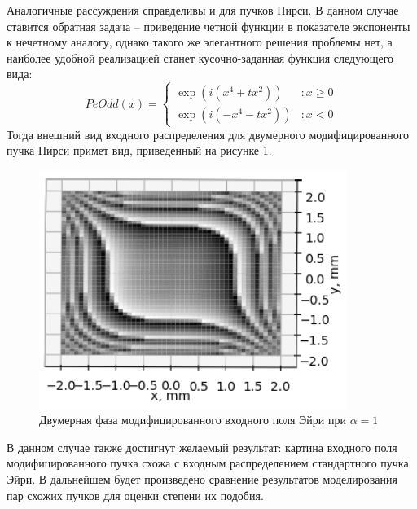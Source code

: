 {{    Аналогичные рассуждения справделивы и для пучков Пирси.
    В данном случае ставится обратная задача -- приведение четной функции в показателе экспоненты к нечетному аналогу,
    однако такого же элегантного решения проблемы нет, а наиболее удобной реализацией станет кусочно-заданная функция следующего вида:
    \[PeOdd(x) = \left\{
    \begin{array}{lr}
        \exp(i(x^4 + tx^2)) & : x \ge 0\\
        \exp(i(-x^4 - tx^2)) & : x < 0
    \end{array}
    \right.
    \]
    Тогда внешний вид входного распределения для двумерного модифицированного пучка Пирси примет вид, приведенный на рисунке \ref{peodd_phase_2d}.
    \begin{figure}[H]
        \begin{center}
            \includegraphics[width=10cm]{plots/peoddphase_new}
            \caption{Двумерная фаза модифицированного входного поля Эйри при $\alpha  = 1$}
            \label{peodd_phase_2d}
        \end{center}
    \end{figure}
    В данном случае также достигнут желаемый результат: картина входного поля модифицированного пучка схожа с входным распределением стандартного пучка Эйри.
    В дальнейшем будет произведено сравнение результатов моделирования пар схожих пучков для оценки степени их подобия.
    }\label{subsec:изменение-характеристик-пространственных-спектров}
    }\label{sec:построение-входных-распределений-пучков-эйри,-пирси-и-их-модификаций-в-виде-пространственных-спектров}
    \newpage


